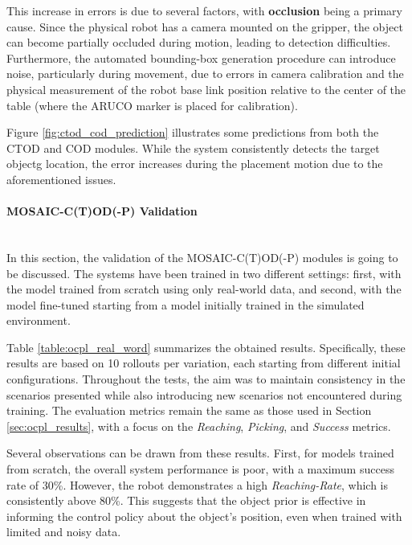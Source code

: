This increase in errors is due to several factors, with \textbf{occlusion} being a primary cause. Since the physical robot has a camera mounted on the gripper, the object can become partially occluded during motion, leading to detection difficulties. Furthermore, the automated bounding-box generation procedure can introduce noise, particularly during movement, due to errors in camera calibration and the physical measurement of the robot base link position relative to the center of the table (where the ARUCO marker is placed for calibration).

Figure \ref{fig:ctod_cod_prediction} illustrates some predictions from both the CTOD and COD modules. While the system consistently detects the target objectg location, the error increases during the placement motion due to the aforementioned issues.



\paragraph*{MOSAIC-C(T)OD(-P) Validation}\mbox{}\\
In this section, the validation of the MOSAIC-C(T)OD(-P) modules is going to be discussed. The systems have been trained in two different settings: first, with the model trained from scratch using only real-world data, and second, with the model fine-tuned starting from a model initially trained in the simulated environment.

Table \ref{table:ocpl_real_word} summarizes the obtained results. Specifically, these results are based on 10 rollouts per variation, each starting from different initial configurations. Throughout the tests, the aim was to maintain consistency in the scenarios presented while also introducing new scenarios not encountered during training. The evaluation metrics remain the same as those used in Section \ref{sec:ocpl_results}, with a focus on the \textit{Reaching}, \textit{Picking}, and \textit{Success} metrics.


Several observations can be drawn from these results. First, for models trained from scratch, the overall system performance is poor, with a maximum success rate of 30\%. However, the robot demonstrates a high \textit{Reaching-Rate}, which is consistently above 80\%. This suggests that the object prior is effective in informing the control policy about the object's position, even when trained with limited and noisy data. 


